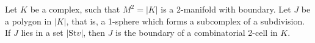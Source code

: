 Let $K$ be a complex, such that $M^2 = |K|$ is a 2-manifold with boundary. Let $J$ be a polygon in $|K|$, that is, a 1-sphere which forms a subcomplex of a subdivision. If $J$ lies in a set $| \text{St} v|$, then $J$ is the boundary of a combinatorial 2-cell in $K$.
